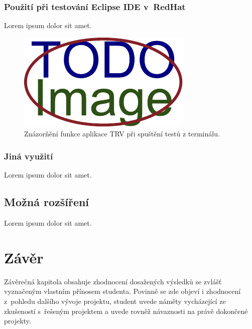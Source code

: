     \subsection{Použití při testování Eclipse IDE v~RedHat}
    Lorem ipsum dolor sit amet.

    \begin{figure}[!h]
	\includegraphics[width=\textwidth, center]{obrazky-figures/placeholder.pdf}
	\caption{Znázorňění funkce aplikace TRV při spuštění testů z terminálu.}
	\label{fig:TRV_run_from_term}
      \end{figure}

    \subsection{Jiná využití}
    Lorem ipsum dolor sit amet.

  \section{Možná rozšíření}
  Lorem ipsum dolor sit amet.

\chapter{Závěr}                                                           %
Závěrečná kapitola obsahuje zhodnocení dosažených výsledků se zvlášť vyznačeným vlastním přínosem studenta. Povinně se zde objeví i zhodnocení z~pohledu dalšího vývoje projektu, student uvede náměty vycházející ze zkušeností s~řešeným projektem a uvede rovněž návaznosti na právě dokončené projekty.

